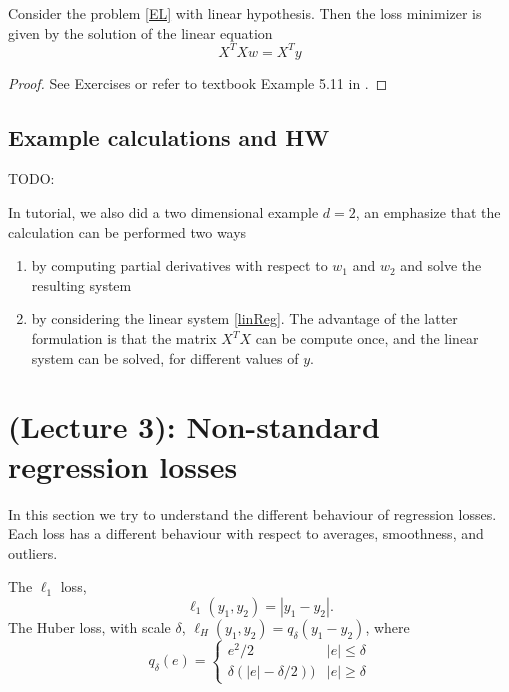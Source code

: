 \documentclass[12pt]{amsart}
\begin{document}
\begin{theorem}\label{thm.quadratic.regression}
	Consider the problem \eqref{EL} with linear hypothesis. Then the loss minimizer is given by the solution of the linear equation
\begin{equation}\label{linReg}\tag{MEL}
	X^TX w = X^T y
\end{equation}
\end{theorem}

\begin{proof}
	See Exercises or refer to textbook Example 5.11 in \cite{deisenroth2020mathematics}.
\end{proof}



\subsection{Example calculations and HW}

TODO: 


In tutorial, we also did a two dimensional example $d=2$, an emphasize that the calculation can be performed two ways
\begin{enumerate}
	\item by computing  partial derivatives with respect to $w_1$ and $w_2$ and solve the resulting system
	\item by considering the linear system  \eqref{linReg}.  The advantage of the latter formulation is that the matrix $X^TX$ can be compute once, and the linear system can be solved, for different values of $y$. 
\end{enumerate}




\section{(Lecture 3): Non-standard regression losses}

In this section we try to understand the different behaviour of regression losses. 
Each loss has a different behaviour with respect to averages, smoothness, and outliers.

\begin{definition}
The $\ell_1$ loss,
	\[
	\ell_1(y_1,y_2) = |y_1-y_2|.
	\]  	
The Huber loss, with scale $\delta$,  $\ell_H(y_1,y_2) = q_\delta(y_1-y_2)$, where
		\[
		q_\delta(e) = 
		\begin{cases}
			 e^2/2 &  |e| \leq \delta \\
			 \delta(|e|-\delta/2)) &  |e| \geq \delta
		\end{cases}	 
		 \] 
\end{definition}
\end{document}
